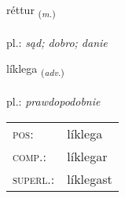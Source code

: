 \documentclass[frontgrid, backgrid]{flacards}\usepackage[]{graphicx}\usepackage[]{xcolor}
\begin{document}
\renewcommand{\flhead}{\vskip5pt \fboxsep=0pt {\small\bfseries\footnotesize Nafnorð | rzeczownik}}
\renewcommand{\fcfoot}{\vskip5pt \fboxsep=0pt \hspace{2pt}{\small\bfseries\footnotesize 1K}}

\renewcommand{\blhead}{\vskip5pt {\small\bfseries\footnotesize Nafnorð | rzeczownik }}
\renewcommand{\bcfoot}{\vskip5pt \hspace{2pt}{\small\bfseries\footnotesize 1K}}


{réttur \small{\textsubscript{(\textit{m.})}} \\[1ex] %
\textphonetic{[rjɛhtʏr]} \\
pl.: \emph{sąd; dobro; danie} \\  [2ex]
\renewcommand*{\arraystretch}{0.8}
}

\renewcommand{\flhead}{\vskip5pt \fboxsep=0pt {\small\bfseries\footnotesize Atviksorð | przysłówek}}
\renewcommand{\fcfoot}{\vskip5pt \fboxsep=0pt \hspace{2pt}{\small\bfseries\footnotesize 1K}}

\renewcommand{\blhead}{\vskip5pt {\small\bfseries\footnotesize Atviksorð | przysłówek }}
\renewcommand{\bcfoot}{\vskip5pt \hspace{2pt}{\small\bfseries\footnotesize 1K}}


{líklega \small{\textsubscript{(\textit{adv.})}} \\[1ex] %
\textphonetic{[lihklɛɣa]} \\
pl.: \emph{prawdopodobnie} \\  [2ex]
\renewcommand*{\arraystretch}{0.8}
\begin{tabular}{ll}
\textsc{pos}: & líklega \\ 
\textsc{comp.}: & líklegar \\ 
\textsc{superl.}: & líklegast \\
\end{tabular}
}
\end{document}
